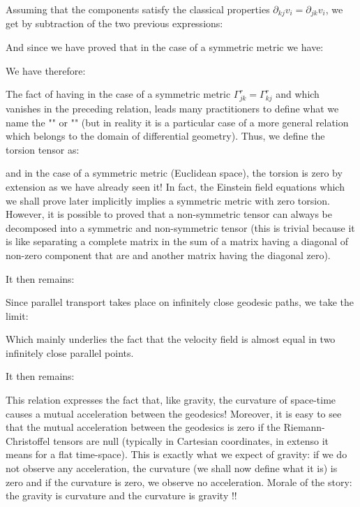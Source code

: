 	Assuming that the components satisfy the classical properties $\partial_{kj}v_i=\partial_{jk}v_i$, we get by subtraction of the two previous expressions:
	
	And since we have proved that in the case of a symmetric metric we have:
	
	We have therefore:
	
	\begin{tcolorbox}[title=Remark,colframe=black,arc=10pt]
	The fact of having in the case of a symmetric metric $\Gamma_{jk}^r=\Gamma_{kj}^r$ and which vanishes in the preceding relation, leads many practitioners to define what we name the "\label{torsion tensor}" or "" (but in reality it is a particular case of a more general relation which belongs to the domain of differential geometry). Thus, we define the torsion tensor as:
	
	and in the case of a symmetric metric (Euclidean space), the torsion is zero by extension as we have already seen it! In fact, the Einstein field equations which we shall prove later implicitly implies a symmetric metric with zero torsion. However, it is possible to proved that a non-symmetric tensor can always be decomposed into a symmetric and non-symmetric tensor (this is trivial because it is like separating a complete matrix in the sum of a matrix having a diagonal of non-zero component that are and another matrix having the diagonal zero).
	\end{tcolorbox}
	It then remains:
	
	Since parallel transport takes place on infinitely close geodesic paths, we take the limit:
	
	Which mainly underlies the fact that the velocity field is almost equal in two infinitely close parallel points.

	It then remains:
	
	This relation expresses the fact that, like gravity, the curvature of space-time causes a mutual acceleration between the geodesics! Moreover, it is easy to see that the mutual acceleration between the geodesics is zero if the Riemann-Christoffel tensors are null (typically in Cartesian coordinates, in extenso it means for a flat time-space). This is exactly what we expect of gravity: if we do not observe any acceleration, the curvature (we shall now define what it is) is zero and if the curvature is zero, we observe no acceleration. Morale of the story: the gravity is curvature and the curvature is gravity !!


